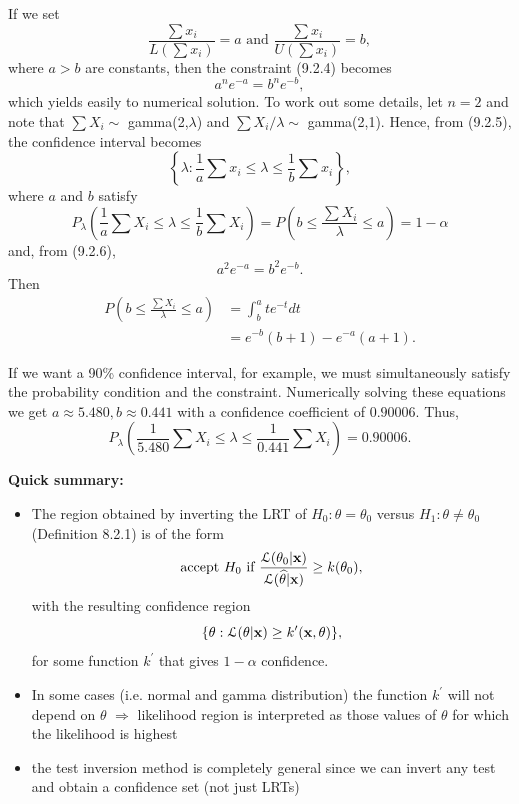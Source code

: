 \documentclass[11pt,]{article}
\def\bx{{\bf x}}
\def\thetahat{{\widehat\theta}}
\def\Lsc{{\cal L}}
\begin{document}
If we set \begin{equation*}
\frac{\sum x_i}{L(\sum x_i) }  = a \mbox{ and } \frac{\sum x_i}{U(\sum x_i) } = b,\tag{9.2.5}
\end{equation*} where \(a > b\) are constants, then the constraint
(9.2.4) becomes \begin{equation*}
a^n e^{-a} = b^n e^{-b}, \tag{9.2.6}
\end{equation*} which yields easily to numerical solution. To work out
some details, let \(n=2\) and note that \(\sum X_i \sim\)
gamma(2,\(\lambda\)) and \(\sum X_i /\lambda \sim\) gamma(2,1). Hence,
from (9.2.5), the confidence interval becomes
\[\left\{\lambda: \frac{1}{a} \sum x_i \leq \lambda \leq \frac{1}{b} \sum x_i \right\},\]
where \(a\) and \(b\) satisfy
\[P_\lambda \left( \frac{1}{a} \sum X_i \leq \lambda \leq \frac{1}{b} \sum X_i\right) = P\left( b \leq \frac{\sum X_i}{\lambda} \leq a \right) = 1-\alpha\]
and, from (9.2.6), \[a^2 e^{-a} = b^2 e^{-b}.\] Then \begin{align*}
 P\left( b \leq \frac{\sum X_i}{\lambda} \leq a \right) &= \int_{b}^{a} t e^{-t} dt\\
&= e^{-b} (b+1) - e^{-a} (a+1).
\end{align*}

If we want a 90\% confidence interval, for example, we must
simultaneously satisfy the probability condition and the constraint.
Numerically solving these equations we get
\(a \approx 5.480, b \approx 0.441\) with a confidence coefficient of
\(0.90006\). Thus,
\[P_\lambda \left(\frac{1}{5.480} \sum X_i \leq \lambda \leq \frac{1}{0.441} \sum X_i \right) = 0.90006.\]

\noindent\textbf{Quick summary:}

\begin{itemize}
\item The region obtained by inverting the LRT of $H_0: \theta = \theta_0$ versus $H_1: \theta \neq \theta_0$ (Definition 8.2.1) is of the form
$$\mbox{accept } H_0 \mbox{ if } \frac{\Lsc(\theta_0 | \bx)}{\Lsc(\thetahat | \bx)} \geq k(\theta_0),$$
with the resulting confidence region
$$\{ \theta: \Lsc(\theta | \bx) \geq k^\prime(\bx,\theta)\},$$
for some function $k^\prime$ that gives $1-\alpha$ confidence.
\item In some cases (i.e. normal and gamma distribution) the function $k^\prime$ will not depend on $\theta$ $\Rightarrow$ likelihood region is interpreted as those values of $\theta$ for which the likelihood is highest
\item the test inversion method is completely general since we can invert any test and obtain a confidence set (not just LRTs)
\end{itemize}
\end{document}
